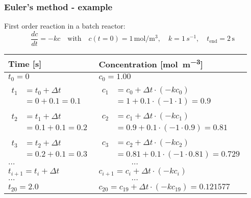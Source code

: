 \documentclass[11pt,table,final,fleqn,xcolor={usenames,dvipsnames,table}]{beamer}
\begin{document}
\begin{frame}
  \frametitle{Euler's method - example}
  First order reaction in a batch reactor:
  \[
    \frac{dc}{dt} = -kc \quad \text{with} \quad c(t=0) = 1\, \si{\mole\per\cubic\meter}, \quad k = 1\, \si{s^{-1}}, \quad t_\text{end} = 2\, \si{\second}
  \]
  \pause
  \footnotesize\selectfont
  \begin{longtable}{p{}p{}}
  \hline
    Time [\si{\second}] & Concentration [\si{\mole\per\cubic\meter}] \\ \hline
    $t_0 = 0$                                 & $c_0 = 1.00$ \\
    $\begin{aligned}t_1 &= t_0 + \Delta t\\ &= 0 + 0.1 = 0.1\end{aligned}$    & $\begin{aligned}c_1 &= c_0 + \Delta t \cdot (-kc_0) \\ &= 1 + 0.1 \cdot (-1 \cdot 1) = 0.9\end{aligned}$ \\
    $\begin{aligned}t_2 &= t_1 + \Delta t\\ &= 0.1 + 0.1 = 0.2\end{aligned}$  & $\begin{aligned}c_2 &= c_1 + \Delta t \cdot (-kc_1)\\ &= 0.9 + 0.1 \cdot (-1 \cdot 0.9) = 0.81\end{aligned}$ \\ 
    $\begin{aligned} t_3 &= t_2 + \Delta t \\ &= 0.2 + 0.1 = 0.3\end{aligned}$  & $\begin{aligned}c_3 &= c_2 + \Delta t \cdot (-kc_2)\\ &= 0.81 + 0.1 \cdot (-1 \cdot 0.81) = 0.729 \end{aligned}$ \\ 
    \centering$\ldots$                                  & $\quad \quad \quad \quad \ldots$ \\
    $t_{i+1} = t_i + \Delta t$                & $c_{i+1} = c_i + \Delta t \cdot (-k c_i) $ \\
    \centering$\ldots$ & $\quad \quad \quad \quad \ldots$ \\
    $t_{20} = 2.0 $ & $c_{20} = c_{19} + \Delta t \cdot (-k c_{19}) = 0.121577$ \\
    \hline
  \end{longtable}
\end{frame}
\end{document}
